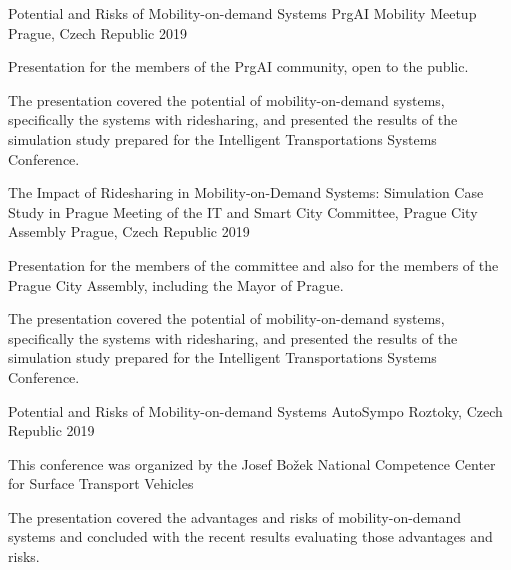 

\begin{cventries}

  \cventry
    {Potential and Risks of Mobility-on-demand Systems} %
    {PrgAI Mobility Meetup} %
    {Prague, Czech Republic} %
    {2019} %
    {
      \begin{cvitems} %
        \item {Presentation for the members of the PrgAI community, open to the public.}
        \item {The presentation covered the potential of mobility-on-demand systems, specifically the systems with ridesharing, and presented the results of the simulation study prepared for the Intelligent Transportations Systems Conference.}
      \end{cvitems}
    }

  \cventry
    {The Impact of Ridesharing in Mobility-on-Demand Systems: Simulation Case Study in Prague} %
    {Meeting of the IT and Smart City Committee, Prague City Assembly} %
    {Prague, Czech Republic} %
    {2019} %
    {
      \begin{cvitems} %
        \item {Presentation for the members of the committee and also for the members of the Prague City Assembly, including the Mayor of Prague.}
        \item {The presentation covered the potential of mobility-on-demand systems, specifically the systems with ridesharing, and presented the results of the simulation study prepared for the Intelligent Transportations Systems Conference.}
      \end{cvitems}
    }

  \cventry
    {Potential and Risks of Mobility-on-demand Systems} %
    {AutoSympo} %
    {Roztoky, Czech Republic} %
    {2019} %
    {
      \begin{cvitems} %
        \item {This conference was organized by the Josef Božek National Competence Center for Surface Transport Vehicles}
        \item {The presentation covered the advantages and risks of mobility-on-demand systems and concluded with the recent results evaluating those advantages and risks.}
      \end{cvitems}
    }


\end{cventries}
